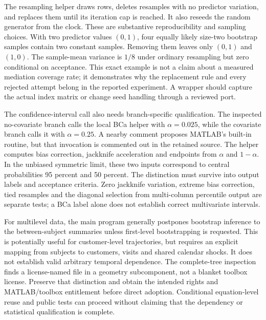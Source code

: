 The resampling helper draws rows, deletes resamples with no predictor variation,
and replaces them until its iteration cap is reached. It also reseeds the random
generator from the clock. These are substantive reproducibility and sampling
choices. With two predictor values $(0,1)$, four equally likely size-two bootstrap
samples contain two constant samples. Removing them leaves only $(0,1)$ and
$(1,0)$. The sample-mean variance is $1/8$ under ordinary resampling but zero
conditional on acceptance. This exact example is not a claim about a measured
mediation coverage rate; it demonstrates why the replacement rule and every
rejected attempt belong in the reported experiment. A wrapper should capture
the actual index matrix or change seed handling through a reviewed port.
\citep{exec25_omed_canlab,exec25_omed_choice}

The confidence-interval call also needs branch-specific qualification. The
inspected no-covariate branch calls the local BCa helper with $\alpha=0.025$,
while the covariate branch calls it with $\alpha=0.25$. A nearby comment proposes
MATLAB's built-in routine, but that invocation is commented out in the retained
source. The helper computes bias correction, jackknife acceleration and endpoints
from $\alpha$ and $1-\alpha$. In the unbiased symmetric limit, these two inputs
correspond to central probabilities 95 percent and 50 percent. The distinction
must survive into output labels and acceptance criteria. Zero jackknife
variation, extreme bias correction, tied resamples and the diagonal selection
from multi-column percentile output are separate tests; a BCa label alone does
not establish correct multivariate intervals.\citep{exec25_omed_canlab,exec25_omed_choice}

For multilevel data, the main program generally postpones bootstrap inference
to the between-subject summaries unless first-level bootstrapping is requested.
This is potentially useful for customer-level trajectories, but requires an
explicit mapping from subjects to customers, visits and shared calendar shocks.
It does not establish valid arbitrary temporal dependence. The complete-tree
inspection finds a license-named file in a geometry subcomponent, not a blanket
toolbox license. Preserve that distinction and obtain the intended rights and
MATLAB/toolbox entitlement before direct adoption. Conditional equation-level
reuse and public tests can proceed without claiming that the dependency or
statistical qualification is complete.\citep{exec25_omed_canlab,exec25_omed_choice}

